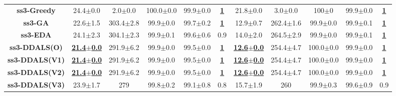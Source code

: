 \documentclass[lettersize,journal]{IEEEtran}
\begin{document}
\begin{table}[!t]
{\begin{tabular}{ccccccccccc}
    \midrule
    {\bfseries ss3-Greedy} &24.4$\pm$0.0&2.0$\pm$0.0 & 100.0$\pm$0.0&99.9$\pm$0.0 &\underline{\bfseries 1} &21.8$\pm$0.0&3.0$\pm$0.0& 100$\pm$0&99.9$\pm$0.0 &\underline{\bfseries 1} \\
    {\bfseries ss3-GA} &22.6$\pm$1.5&303.4$\pm$2.8 & 99.9$\pm$0.0 & 99.7$\pm$0.2 &\underline{\bfseries 1} &12.9$\pm$0.7 & 262.4$\pm$1.6&99.9$\pm$0.0&99.9$\pm$0.1 &\underline{\bfseries 1} \\
    {\bfseries ss3-EDA} &24.1$\pm$2.3&304.1$\pm$2.3 & 99.9$\pm$0.1&99.6$\pm$0.6&0.9&14.0$\pm$2.0&264.5$\pm$2.9& 99.9$\pm$0.0&99.9$\pm$0.1 &\underline{\bfseries 1} \\
    {\bfseries ss3-DDALS(O)} &\underline{\bfseries 21.4$\pm$0.0} &291.9$\pm$6.2 & 99.9$\pm$0.0&99.5$\pm$0.0 &\underline{\bfseries 1} &\underline{\bfseries 12.6$\pm$0.0} &254.4$\pm$4.7& 100.0$\pm$0.0 &99.9$\pm$0.0  &\underline{\bfseries 1} \\
    {\bfseries ss3-DDALS(V1)} &\underline{\bfseries 21.4$\pm$0.0} &291.9$\pm$6.2 & 99.9$\pm$0.0&99.5$\pm$0.0 &\underline{\bfseries 1} &\underline{\bfseries 12.6$\pm$0.0}&254.4$\pm$4.7& 100.0$\pm$0.0&99.9$\pm$0.0  &\underline{\bfseries 1} \\ 
    {\bfseries ss3-DDALS(V2)} &\underline{\bfseries 21.4$\pm$0.0} &291.9$\pm$6.2 & 99.9$\pm$0.0&99.5$\pm$0.0 &\underline{\bfseries 1} &\underline{\bfseries 12.6$\pm$0.0}&254.4$\pm$4.7& 100.0$\pm$0.0&99.9$\pm$0.0  &\underline{\bfseries 1} \\
    {\bfseries ss3-DDALS(V3)} &23.9$\pm$1.7&279 & 99.8$\pm$0.2&99.1$\pm$0.8&0.8&15.7$\pm$1.9&260& 99.9$\pm$0.3&99.6$\pm$0.9  &0.9 \\
    

\end{tabular}}
\end{table}
\end{document}
